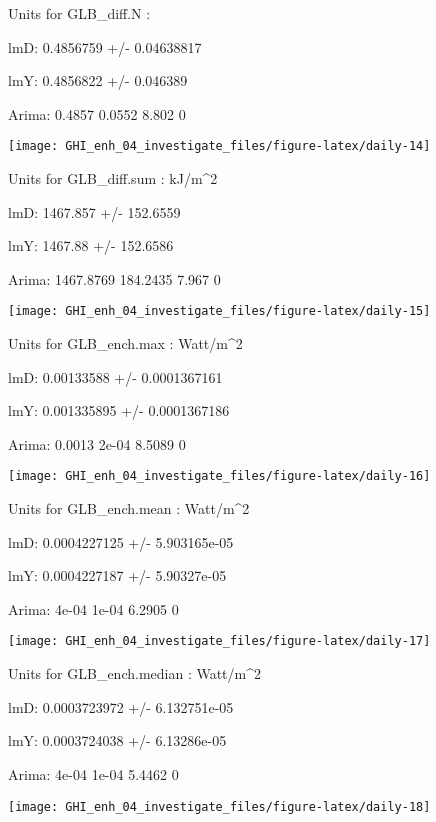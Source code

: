 \documentclass[
  10pt,
  a4paper,oneside]{article}
\begin{document}
Units for GLB\_diff.N :

lmD: 0.4856759 +/- 0.04638817

lmY: 0.4856822 +/- 0.046389

Arima: 0.4857 0.0552 8.802 0

\begin{center}\texttt{[image: GHI\_enh\_04\_investigate\_files/figure-latex/daily-14]} \end{center}

Units for GLB\_diff.sum : kJ/m\^{}2

lmD: 1467.857 +/- 152.6559

lmY: 1467.88 +/- 152.6586

Arima: 1467.8769 184.2435 7.967 0

\begin{center}\texttt{[image: GHI\_enh\_04\_investigate\_files/figure-latex/daily-15]} \end{center}

Units for GLB\_ench.max : Watt/m\^{}2

lmD: 0.00133588 +/- 0.0001367161

lmY: 0.001335895 +/- 0.0001367186

Arima: 0.0013 2e-04 8.5089 0

\begin{center}\texttt{[image: GHI\_enh\_04\_investigate\_files/figure-latex/daily-16]} \end{center}

Units for GLB\_ench.mean : Watt/m\^{}2

lmD: 0.0004227125 +/- 5.903165e-05

lmY: 0.0004227187 +/- 5.90327e-05

Arima: 4e-04 1e-04 6.2905 0

\begin{center}\texttt{[image: GHI\_enh\_04\_investigate\_files/figure-latex/daily-17]} \end{center}

Units for GLB\_ench.median : Watt/m\^{}2

lmD: 0.0003723972 +/- 6.132751e-05

lmY: 0.0003724038 +/- 6.13286e-05

Arima: 4e-04 1e-04 5.4462 0

\begin{center}\texttt{[image: GHI\_enh\_04\_investigate\_files/figure-latex/daily-18]} \end{center}
\end{document}
